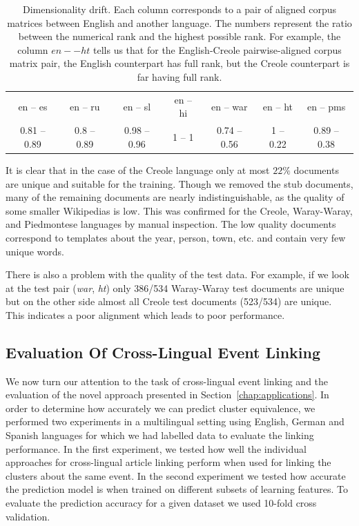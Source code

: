 \begin{table}[t]
\label{table:rank}
\begin{center}
\begin{tabular}{|c|c|c|c|c|c|c|}
\cline{1-7}
en -- es     &   en -- ru     &   en -- sl       &     en -- hi &   en -- war      &      en -- ht &   en -- pms\\
\cline{1-7}
0.81 -- 0.89   &  0.8 -- 0.89  &   0.98 -- 0.96    &    1 -- 1  &  0.74 -- 0.56  &      1 -- 0.22  &   0.89 -- 0.38\\
\cline{1-7}
\end{tabular}
\end{center}
\caption{Dimensionality drift. Each column corresponds to a pair of aligned corpus matrices between
English and another language. The numbers represent the ratio between the numerical rank and the highest
possible rank. For example, the column $en -- ht$ tells us that for the English-Creole pairwise-aligned
corpus matrix pair, the English counterpart has full rank, but the Creole counterpart is far having full rank.}
\end{table}

It is clear that in the case of the Creole language only at most $22\%$ documents are unique and suitable 
for the training. Though we removed the stub documents, many of the remaining documents are nearly indistinguishable, 
as the quality of some smaller Wikipedias is low. This was confirmed for the Creole, Waray-Waray, 
and Piedmontese languages by manual inspection. The low quality documents correspond to templates 
about the year, person, town, etc. and contain very few unique words.

There is also a problem with the quality of the test data. For example, if we look at the 
test pair (\emph{war}, \emph{ht}) only 386/534 Waray-Waray test documents are unique but 
on the other side almost all Creole test documents (523/534) are unique. This indicates a poor 
alignment which leads to poor performance.


\subsection{Evaluation Of Cross-Lingual Event Linking}
We now turn our attention to the task of cross-lingual event linking and the 
evaluation of the novel approach presented in Section~\ref{chap:applications}.
In order to determine how accurately we can predict cluster equivalence, we performed two 
experiments in a multilingual setting using English, German and Spanish languages for which 
we had labelled data to evaluate the linking performance. In the first experiment, 
we tested how well the individual approaches for cross-lingual article linking 
perform when used for linking the clusters about the same event. In the second 
experiment we tested how accurate the prediction model is when trained on different 
subsets of learning features. To evaluate the prediction accuracy for a given dataset 
we used 10-fold cross validation.

